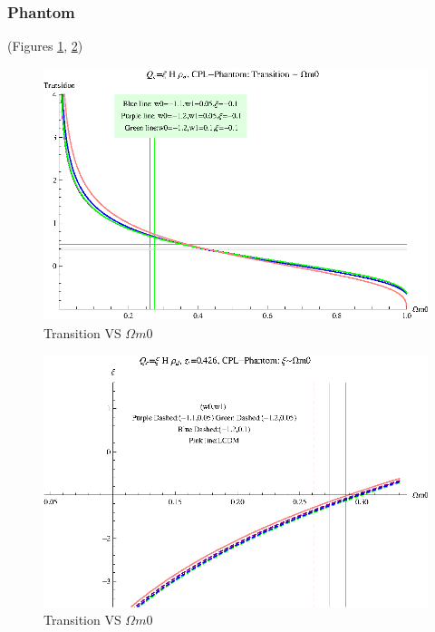 \documentclass[12pt,a4paper]{article}
\begin{document}
\subsubsection{Phantom}

(Figures \ref{fig-rhod_I2CCPL_Phan_TransVSOmegam0}, \ref{fig-rhod_I2CCPL_Phan_xiVSOmegam0})



\begin{figure}
\centering
\includegraphics[width=500pt]{rhod_I2CCPL_Phan_TransVSOmegam0.eps}
\caption{Transition VS $\Omega m0$}\label{fig-rhod_I2CCPL_Phan_TransVSOmegam0}
\end{figure}



\begin{figure}
\centering
\includegraphics[width=500pt]{rhod_I2CCPL_Phan_xiVSOmegam0.eps}
\caption{Transition VS $\Omega m0$}\label{fig-rhod_I2CCPL_Phan_xiVSOmegam0}
\end{figure}
\end{document}
